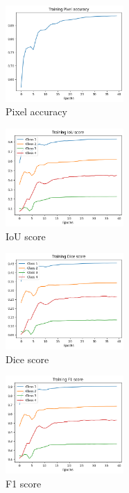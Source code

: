 \begin{figure}[htp!]
    \centering
    \includegraphics[width=0.4\textwidth]{Images/accuracy.png}
    \caption{Pixel accuracy}
    \label{fig:accuracy}
\end{figure}

\begin{figure}[htp!]
    \centering
    \includegraphics[width=0.4\textwidth]{Images/iou.png}
    \caption{IoU score}
    \label{fig:iou}
\end{figure}

\begin{figure}[htp!]
    \centering
    \includegraphics[width=0.4\textwidth]{Images/dice.png}
    \caption{Dice score}
    \label{fig:dice}
\end{figure}

\begin{figure}[htp!]
    \centering
    \includegraphics[width=0.4\textwidth]{Images/f1.png}
    \caption{F1 score}
    \label{fig:f1}
\end{figure}
